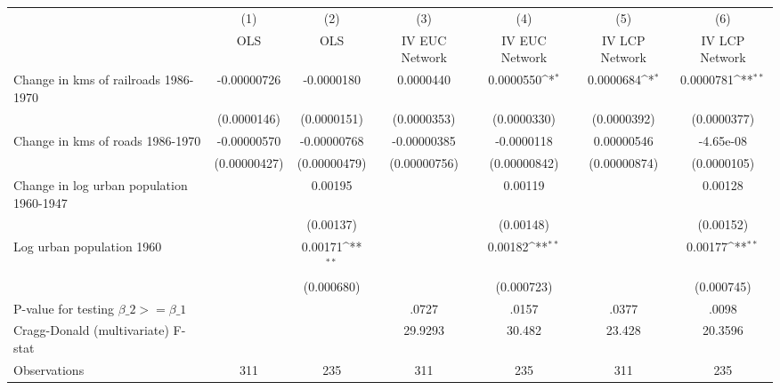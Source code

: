 {
\def\sym#1{\ifmmode^{#1}\else\(^{#1}\)\fi}
\begin{tabular}{l*{6}{c}}
\hline\hline
                &\multicolumn{1}{c}{(1)}&\multicolumn{1}{c}{(2)}&\multicolumn{1}{c}{(3)}&\multicolumn{1}{c}{(4)}&\multicolumn{1}{c}{(5)}&\multicolumn{1}{c}{(6)}\\
                &\multicolumn{1}{c}{OLS}&\multicolumn{1}{c}{OLS}&\multicolumn{1}{c}{IV EUC Network}&\multicolumn{1}{c}{IV EUC Network}&\multicolumn{1}{c}{IV LCP Network}&\multicolumn{1}{c}{IV LCP Network}\\
\hline
Change in kms of railroads 1986-1970&-0.00000726         &-0.0000180         &0.0000440         &0.0000550\sym{*}  &0.0000684\sym{*}  &0.0000781\sym{**} \\
                &(0.0000146)         &(0.0000151)         &(0.0000353)         &(0.0000330)         &(0.0000392)         &(0.0000377)         \\
[1em]
Change in kms of roads 1986-1970&-0.00000570         &-0.00000768         &-0.00000385         &-0.0000118         &0.00000546         &-4.65e-08         \\
                &(0.00000427)         &(0.00000479)         &(0.00000756)         &(0.00000842)         &(0.00000874)         &(0.0000105)         \\
[1em]
Change in log urban population 1960-1947&                  &  0.00195         &                  &  0.00119         &                  &  0.00128         \\
                &                  &(0.00137)         &                  &(0.00148)         &                  &(0.00152)         \\
[1em]
Log urban population 1960&                  &  0.00171\sym{**} &                  &  0.00182\sym{**} &                  &  0.00177\sym{**} \\
                &                  &(0.000680)         &                  &(0.000723)         &                  &(0.000745)         \\
\hline
P-value for testing $\beta\_{2} >= \beta\_{1}$&                  &                  &    .0727         &    .0157         &    .0377         &    .0098         \\
Cragg-Donald (multivariate) F-stat&                  &                  &  29.9293         &   30.482         &   23.428         &  20.3596         \\
Observations    &      311         &      235         &      311         &      235         &      311         &      235         \\
\hline\hline
\end{tabular}
}
